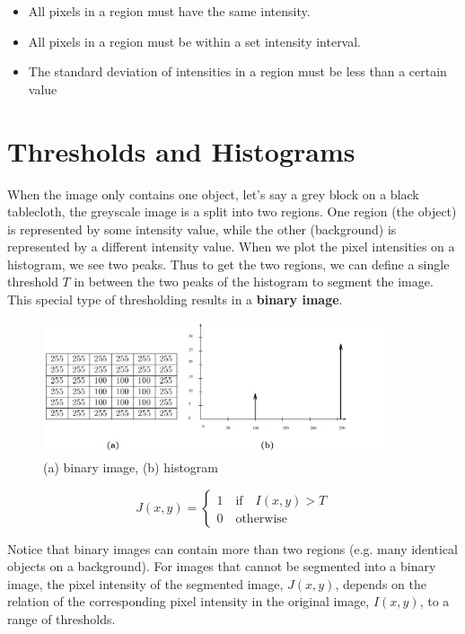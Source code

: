 \documentclass{article}
\begin{document}
\begin{itemize}
    \item All pixels in a region must have the same intensity.
    \item All pixels in a region must be within a set intensity interval.
    \item The standard deviation of intensities in a region must be less than a certain value
\end{itemize}

\section{Thresholds and Histograms}
When the image only contains one object, let's say a grey block on a black tablecloth, the greyscale image is a split into two regions. One region (the object) is represented by some intensity value, while the other (background) is represented by a different intensity value. When we plot the pixel intensities on a histogram, we see two peaks. Thus to get the two regions, we can define a single threshold $T$ in between the two peaks of the histogram to segment the image. This special type of thresholding results in a \textbf{binary image}.  

\begin{figure}[!htb]
    \begin{center}
        \includegraphics[width=0.9\textwidth]{L5F2.png}
        \vspace{-20pt}
    \end{center}
    \caption{(a) binary image, (b) histogram}
\end{figure}
\noindent

$$
J(x, y) = \left\{
        \begin{array}{ll}
            1 \quad \text{if} \quad I(x, y) > T \\
            0 \quad \text{otherwise}
        \end{array}
    \right.
$$

\noindent
Notice that binary images can contain more than two regions (e.g. many identical objects on a background). For images that cannot be segmented into a binary image, the pixel intensity of the segmented image, $J(x, y)$, depends on the relation of the corresponding pixel intensity in the original image, $I(x, y)$, to a range of thresholds. 
\end{document}
